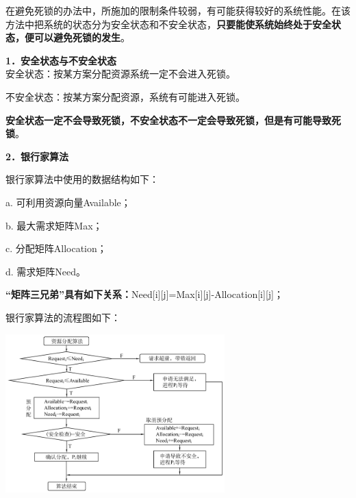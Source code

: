 在避免死锁的办法中，所施加的限制条件较弱，有可能获得较好的系统性能。在该方法中把系统的状态分为安全状态和不安全状态，\textbf{只要能使系统始终处于安全状态，便可以避免死锁的发生}。

\textbf{{1．安全状态与不安全状态}}\\

安全状态：按某方案分配资源系统一定不会进入死锁。

不安全状态：按某方案分配资源，系统{有可能}进入死锁。

{\textbf{安全状态一定不会导致死锁，不安全状态不一定会导致死锁，但是有可能导致死锁}}。

\textbf{{2．银行家算法}}

银行家算法中使用的数据结构如下：

a. 可利用资源向量Available；

b. 最大需求矩阵Max；

c. 分配矩阵Allocation；

d. 需求矩阵Need。

\textbf{``矩阵三兄弟''具有如下关系：}Need{[}i{]}{[}j{]}=Max{[}i{]}{[}j{]}-Allocation{[}i{]}{[}j{]}；

银行家算法的流程图如下：

\includegraphics[width=3.33333in,height=2.41667in]{png-jpeg-pics/EA9C2698F88D504B5EE6D4F328CD9C0C.png}

